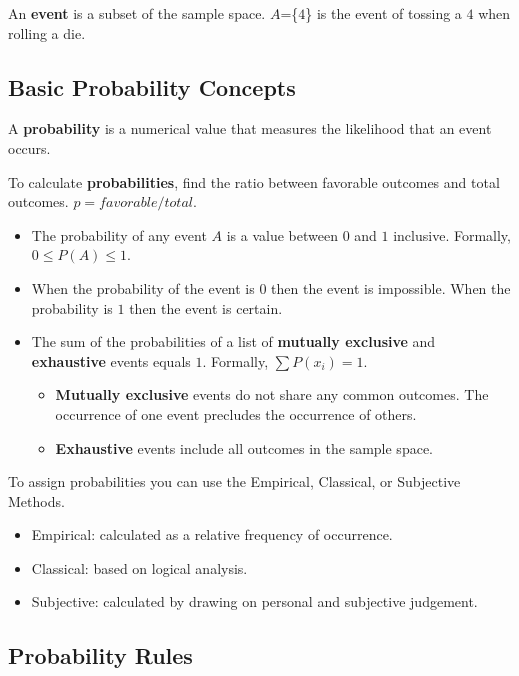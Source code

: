 \documentclass[
  letterpaper,
  DIV=11,
  numbers=noendperiod]{scrreprt}
\begin{document}
An \textbf{event} is a subset of the sample space. \(A\)=\{\(4\)\} is
the event of tossing a \(4\) when rolling a die.

\hypertarget{basic-probability-concepts}{%
\subsection*{Basic Probability
Concepts}\label{basic-probability-concepts}}

A \textbf{probability} is a numerical value that measures the likelihood
that an event occurs.

To calculate \textbf{probabilities}, find the ratio between favorable
outcomes and total outcomes. \(p=favorable/total\).

\begin{itemize}
\item
  The probability of any event \(A\) is a value between \(0\) and \(1\)
  inclusive. Formally, \(0\leq P(A) \leq1\).
\item
  When the probability of the event is \(0\) then the event is
  impossible. When the probability is \(1\) then the event is certain.
\item
  The sum of the probabilities of a list of \textbf{mutually exclusive}
  and \textbf{exhaustive} events equals \(1\). Formally,
  \(\sum P(x_i)=1\).

  \begin{itemize}
  \item
    \textbf{Mutually exclusive} events do not share any common outcomes.
    The occurrence of one event precludes the occurrence of others.
  \item
    \textbf{Exhaustive} events include all outcomes in the sample space.
  \end{itemize}
\end{itemize}

To assign probabilities you can use the Empirical, Classical, or
Subjective Methods.

\begin{itemize}
\item
  Empirical: calculated as a relative frequency of occurrence.
\item
  Classical: based on logical analysis.
\item
  Subjective: calculated by drawing on personal and subjective
  judgement.
\end{itemize}

\hypertarget{probability-rules}{%
\subsection*{Probability Rules}\label{probability-rules}}
\end{document}
